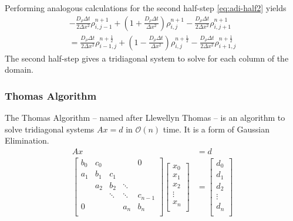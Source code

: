 \documentclass[a4paper]{article}
\begin{document}
Performing analogous calculations for the second half-step \ref{eq:adi-half2} yields
\begin{multline}
	-\frac{D_\rho \Delta t}{2 \Delta x^2} \rho_{i,j-1}^{n + 1} + \left( 1 + \frac{D_\rho \Delta t}{\Delta x^2} \right) \rho_{i,j}^{n + 1} - \frac{D_\rho \Delta t}{2 \Delta x^2} \rho_{i,j+1}^{n + 1} \\
	= \frac{D_\rho \Delta t}{2 \Delta x^2} \rho_{i-1,j}^{n + \frac{1}{2}} + \left( 1 - \frac{D_\rho \Delta t}{\Delta x^2} \right) \rho_{i,j}^{n + \frac{1}{2}} - \frac{D_\rho \Delta t}{2 \Delta x^2} \rho_{i+1,j}^{n + \frac{1}{2}}
\end{multline}
The second half-step gives a tridiagonal system to solve for each column of the domain.

\subsubsection{Thomas Algorithm}
The Thomas Algorithm -- named after Llewellyn Thomas -- is an algorithm to solve tridiagonal systems $Ax = d$ in $\mathcal O(n)$ time.
It is a form of Gaussian Elimination.
\begin{align}
	Ax &= d \\
\begin{bmatrix}
   {b_0} & {c_0} & {   } & {   } & { 0 } \\
   {a_1} & {b_1} & {c_1} & {   } & {   } \\
   {   } & {a_2} & {b_2} & \ddots & {   } \\
   {   } & {   } & \ddots & \ddots & {c_{n-1}}\\
   { 0 } & {   } & {   } & {a_n} & {b_n}\\
\end{bmatrix}
\begin{bmatrix}
   {x_0 }  \\
   {x_1 }  \\
   {x_2 }  \\
   \vdots   \\
   {x_n }  \\
\end{bmatrix}
&=
\begin{bmatrix}
   {d_0 }  \\
   {d_1 }  \\
   {d_2 }  \\
   \vdots   \\
   {d_n }  \\
\end{bmatrix}
\end{align}
\end{document}
